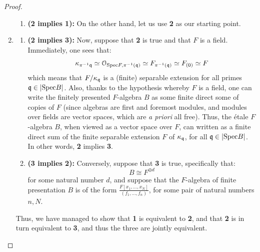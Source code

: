 \begin{proof}
\begin{enumerate}
\begin{enumerate}
                            \item \textbf{(2 implies 1):} On the other hand, let us use \textbf{2} as our starting point. 
                        \end{enumerate}
                    \item 
                        \begin{enumerate}
                            \item \textbf{(2 implies 3):} Now, suppose that \textbf{2} is true and that $F$ is a field. Immediately, one sees that:
                                $$\kappa_{\pi^{-1}{\mathfrak{q}}} \simeq \mathcal{O}_{\mathrm{Spec} F, \pi^{-1}(\mathfrak{q})} \simeq F_{\pi^{-1}(\mathfrak{q})} \simeq F_{(0)} \simeq F$$ 
                            which means that $F/\kappa_{\mathfrak{q}}$ is a (finite) separable extension for all primes $\mathfrak{q} \in \left|\mathrm{Spec} B\right|$. Also, thanks to the hypothesis whereby $F$ is a field, one can write the finitely presented $F$-algebra $B$ as some finite direct some of copies of $F$ (since algebras are first and foremost modules, and modules over fields are vector spaces, which are \textit{a priori} all free). Thus, the \'etale $F$-algebra $B$, when viewed as a vector space over $F$, can written as a finite direct sum of the finite separable extension $F$ of $\kappa_{\mathfrak{q}}$, for all $\mathfrak{q} \in |\mathrm{Spec} B|$. In other words, \textbf{2} implies \textbf{3}. 
                            \item \textbf{(3 implies 2):} Conversely, suppose that \textbf{3} is true, specifically that:
                                $$B \cong F^{\oplus d}$$
                            for some natural number $d$, and suppose that the $F$-algebra of finite presentation $B$ is of the form $\frac{F[x_1, ..., x_N]}{(f_1, ..., f_n)}$, for some pair of natural numbers $n, N$. 
                        \end{enumerate}
                    Thus, we have managed to show that \textbf{1} is equivalent to \textbf{2}, and that \textbf{2} is in turn equivalent to \textbf{3}, and thus the three are jointly equivalent. 
                \end{enumerate}
            \end{proof}
